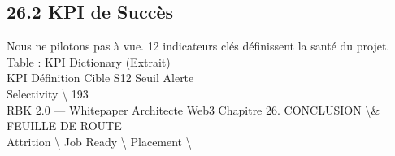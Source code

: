 \subsection{26.2 KPI de Succès}
Nous ne pilotons pas à vue. 12 indicateurs clés définissent la santé du projet.\\
\vspace{0.5em}
Table : KPI Dictionary (Extrait)\\
\vspace{0.5em}
KPI         Définition                Cible S12 Seuil Alerte\\
Selectivity \textbackslash{}%
\vspace{0.5em}
\vspace{0.5em}
\vspace{0.5em}
\vspace{0.5em}
193\\
RBK 2.0 — Whitepaper Architecte Web3                                                       Chapitre 26. CONCLUSION \textbackslash{}& FEUILLE DE ROUTE\\
\vspace{0.5em}
\vspace{0.5em}
\vspace{0.5em}
Attrition \textbackslash{}%
Job Ready \textbackslash{}%
Placement \textbackslash{}%
\vspace{0.5em}
\vspace{0.5em}
\vspace{0.5em}
